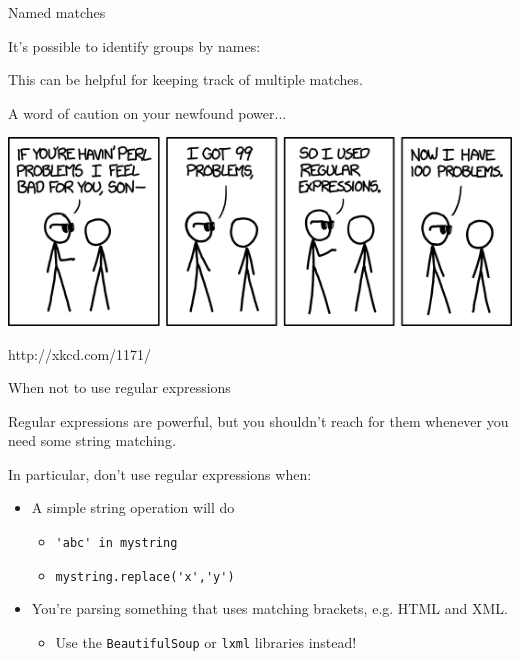 \documentclass{beamer}
\begin{document}
\begin{frame}{Named matches}

It's possible to identify groups by names:



This can be helpful for keeping track of multiple matches.

\end{frame}

  
\begin{frame}{A word of caution on your newfound power...}

\includegraphics[scale=0.5]{images/perl_problems.png} 

http://xkcd.com/1171/

\end{frame}

\begin{frame}{When not to use regular expressions}

Regular expressions are powerful, but you shouldn't reach for them whenever you need some string matching.

\bigskip

In particular, don't use regular expressions when:
\begin{itemize}
 \item A simple string operation will do
	\begin{itemize} 
      \item \lstinline$'abc' in mystring$
      \item \lstinline$mystring.replace('x','y')$
    \end{itemize}
 \item You're parsing something that uses matching brackets, e.g. HTML and XML.
   \begin{itemize}
     \item Use the \lstinline$BeautifulSoup$ or \lstinline$lxml$ libraries instead!
   \end{itemize}
\end{itemize}

\end{frame}
\end{document}
